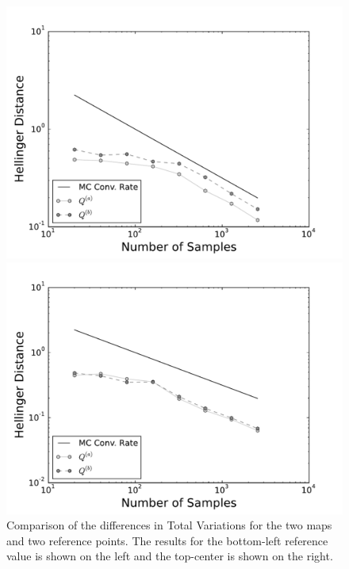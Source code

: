 \begin{figure}[h]
\begin{minipage}{.475\textwidth}
\includegraphics[width=\linewidth]{./images/pt0Plot-reg_BigN_40000_reg_M_1_rand_I_100000}
\end{minipage}
\begin{minipage}{.475\textwidth}
\includegraphics[width=\linewidth]{./images/pt5Plot-reg_BigN_40000_reg_M_1_rand_I_100000}
\end{minipage}
  \caption{Comparison of the differences in Total Variations for the two maps and two reference points. The results for the bottom-left reference value is shown on the left and the top-center is shown on the right.}
\label{fig:NLHD}
\end{figure}

